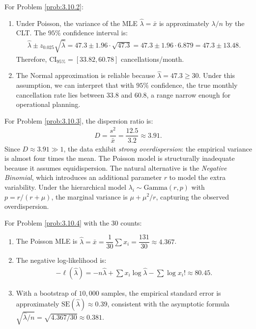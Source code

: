 \begin{solucion}
	\label{sol:3.10.2}
	For Problem \ref{prob:3.10.2}:
	\begin{enumerate}
		\item Under Poisson, the variance of the MLE $\hat{\lambda} = \bar{x}$ is approximately $\lambda/n$ by the CLT. The $95\%$ confidence interval is:
		\begin{align*}
			\hat{\lambda} \pm z_{0.025}\sqrt{\hat{\lambda}} = 47.3 \pm 1.96 \cdot \sqrt{47.3} = 47.3 \pm 1.96 \cdot 6.879 = 47.3 \pm 13.48.
		\end{align*}
		Therefore, $\text{CI}_{95\%} = [33.82, 60.78]$ cancellations/month.
		\item The Normal approximation is reliable because $\hat{\lambda} = 47.3 \ge 30$. Under this assumption, we can interpret that with $95\%$ confidence, the true monthly cancellation rate lies between $33.8$ and $60.8$, a range narrow enough for operational planning.
	\end{enumerate}
\end{solucion}

\begin{solucion}
	\label{sol:3.10.3}
	For Problem \ref{prob:3.10.3}, the dispersion ratio is:
	\begin{align*}
		D = \dfrac{s^{2}}{\bar{x}} = \dfrac{12.5}{3.2} \approx 3.91.
	\end{align*}
	Since $D \approx 3.91 \gg 1$, the data exhibit \emph{strong overdispersion}: the empirical variance is almost four times the mean. The Poisson model is structurally inadequate because it assumes equidispersion. The natural alternative is the \emph{Negative Binomial}, which introduces an additional parameter $r$ to model the extra variability. Under the hierarchical model $\lambda_{i} \sim \text{Gamma}(r, p)$ with $p = r/(r + \mu)$, the marginal variance is $\mu + \mu^{2}/r$, capturing the observed overdispersion.
\end{solucion}

\begin{solucion}
	\label{sol:3.10.4}
	For Problem \ref{prob:3.10.4} with the $30$ counts:
	\begin{enumerate}
		\item The Poisson MLE is $\hat{\lambda} = \bar{x} = \dfrac{1}{30}\sum x_{i} = \dfrac{131}{30} \approx 4.367$.
		\item The negative log-likelihood is:
		\begin{align*}
			-\ell(\hat{\lambda}) = -n\hat{\lambda} + \sum x_{i} \log \hat{\lambda} - \sum \log x_{i}! \approx 80.45.
		\end{align*}
		\item With a bootstrap of $10{,}000$ samples, the empirical standard error is approximately $\text{SE}(\hat{\lambda}) \approx 0.39$, consistent with the asymptotic formula $\sqrt{\hat{\lambda}/n} = \sqrt{4.367/30} \approx 0.381$.
	\end{enumerate}
\end{solucion}

